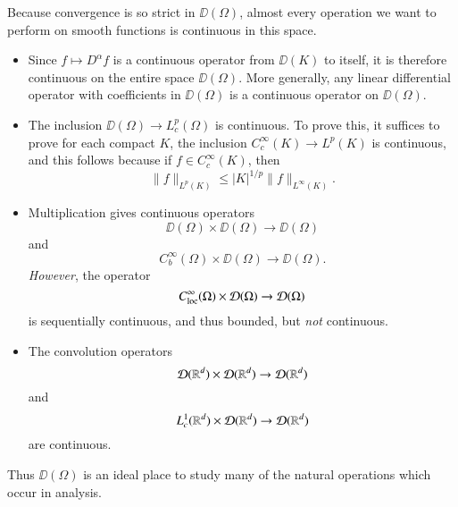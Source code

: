 Because convergence is so strict in $\DD(\Omega)$, almost every operation we want to perform on smooth functions is continuous in this space.
%
\begin{itemize}
    \item Since $f \mapsto D^\alpha f$ is a continuous operator from $\DD(K)$ to itself, it is therefore continuous on the entire space $\DD(\Omega)$. More generally, any linear differential operator with coefficients in $\DD(\Omega)$ is a continuous operator on $\DD(\Omega)$.

    \item The inclusion $\DD(\Omega) \to L^p_c(\Omega)$ is continuous. To prove this, it suffices to prove for each compact $K$, the inclusion $C_c^\infty(K) \to L^p(K)$ is continuous, and this follows because if $f \in C_c^\infty(K)$, then
    \[ \| f \|_{L^p(K)} \leq |K|^{1/p} \| f \|_{L^\infty(K)}. \]

    \item Multiplication gives continuous operators
    \[ \DD(\Omega) \times \DD(\Omega) \to \DD(\Omega) \]
    and
    \[ C^\infty_b(\Omega) \times \DD(\Omega) \to \DD(\Omega). \]
    \emph{However}, the operator
    \[ C^\infty_{\text{loc}}(\Omega) \times \operatorname{\mathcal{D}}(\Omega) \to \operatorname{\mathcal{D}}(\Omega) \]
    is sequentially continuous, and thus bounded, but \emph{not} continuous.

    \item The convolution operators
    \[ \operatorname{\mathcal{D}}(\operatorname{\mathbb{R}}^d) \times \operatorname{\mathcal{D}}(\operatorname{\mathbb{R}}^d) \to \operatorname{\mathcal{D}}(\operatorname{\mathbb{R}}^d) \]
    and
    \[ L^1_c(\operatorname{\mathbb{R}}^d) \times \operatorname{\mathcal{D}}(\operatorname{\mathbb{R}}^d) \to \operatorname{\mathcal{D}}(\operatorname{\mathbb{R}}^d) \]
    are continuous.
\end{itemize}
%
Thus $\DD(\Omega)$ is an ideal place to study many of the natural operations which occur in analysis.

